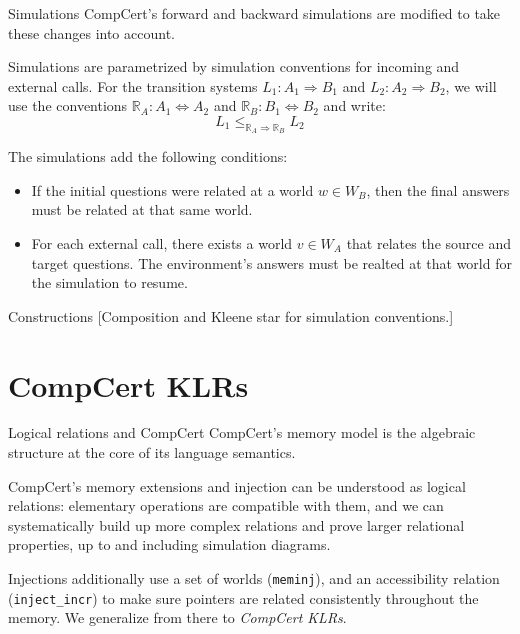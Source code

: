 \documentclass{beamer}
\begin{document}
\begin{frame}{Simulations} %
CompCert's forward and backward simulations are modified to
take these changes into account.

\vspace{1em}
Simulations are parametrized by simulation conventions
for incoming and external calls.
For the transition systems $L_1 : A_1 \Rightarrow B_1$ and
$L_2 : A_2 \Rightarrow B_2$,
we will use the conventions $\mathbb{R}_A : A_1 \Leftrightarrow A_2$
and $\mathbb{R}_B : B_1 \Leftrightarrow B_2$ and write:
\[
    L_1 \le_{\mathbb{R}_A \Rightarrow \mathbb{R}_B} L_2
\]

The simulations add the following conditions:
\begin{itemize}
\item If the initial questions were related at a world $w \in W_B$,
  then the final answers must be related at that same world.
\item For each external call,
  there exists a world $v \in W_A$ that relates
  the source and target questions.
  The environment's answers must be realted at that world
  for the simulation to resume.
\end{itemize}

\end{frame}

\begin{frame}{Constructions}
[Composition and Kleene star for simulation conventions.]
\end{frame}


\section{CompCert KLRs}

\begin{frame}{Logical relations and CompCert}
CompCert's memory model
is the algebraic structure at the core of
its language semantics.

\vspace{1em}
CompCert's memory extensions and injection
can be understood as logical relations:
elementary operations are compatible with them,
and we can systematically build up more complex relations
and prove larger relational properties,
up to and including simulation diagrams.

\vspace{1em}
Injections additionally use a set of worlds (\texttt{meminj}),
and an accessibility relation (\texttt{inject\_incr})
to make sure pointers are related consistently throughout
the memory.
We generalize from there
to \emph{CompCert KLRs}.
\end{frame}
\end{document}
